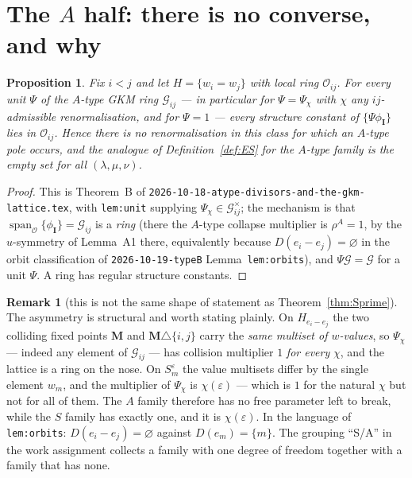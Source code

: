 \documentclass[11pt]{article}
\newtheorem{prop}[thm]{Proposition}
\theoremstyle{definition}
\newtheorem{rem}[thm]{Remark}
\newcommand{\bM}{\mathbf{M}}
\newcommand{\bI}{\mathbf{I}}
\begin{document}
\section{The $A$ half: there is no converse, and why}
\label{sec:Ahalf}

\begin{prop}\label{prop:A}
Fix $i<j$ and let $H=\{w_i=w_j\}$ with local ring $\mathcal{O}_{ij}$.  For
\emph{every} unit $\Psi$ of the $A$-type GKM ring $\mathcal{G}_{ij}$ --- in
particular for $\Psi=\Psi_\chi$ with $\chi$ any $ij$-admissible renormalisation,
and for $\Psi=1$ --- every structure constant of $\{\Psi\phi_{\bI}\}$ lies in
$\mathcal{O}_{ij}$.  Hence there is no renormalisation in this class for which an
$A$-type pole occurs, and the analogue of Definition~\ref{def:ES} for the
$A$-type family is the empty set for all $(\lambda,\mu,\nu)$.
\end{prop}

\begin{proof}
This is Theorem~B of
\texttt{2026-10-18-atype-divisors-and-the-gkm-lattice.tex}, with
\texttt{lem:unit} supplying $\Psi_\chi\in\mathcal{G}_{ij}^{\times}$; the mechanism
is that $\operatorname{span}_{\mathcal{O}}\{\phi_{\bI}\}=\mathcal{G}_{ij}$ is a
\emph{ring} (there the $A$-type collapse multiplier is $\rho^{A}=1$, by the
$u$-symmetry of Lemma~A1 there, equivalently because $D(e_i-e_j)=\varnothing$ in
the orbit classification of \texttt{2026-10-19-typeB} Lemma~\texttt{lem:orbits}),
and $\Psi\mathcal{G}=\mathcal{G}$ for a unit $\Psi$.  A ring has regular
structure constants.
\end{proof}

\begin{rem}[this is not the same shape of statement as Theorem~\ref{thm:Sprime}]
The asymmetry is structural and worth stating plainly.  On $H_{e_i-e_j}$ the two
colliding fixed points $\bM$ and $\bM\triangle\{i,j\}$ carry the \emph{same
multiset of $w$-values}, so $\Psi_\chi$ --- indeed any element of
$\mathcal{G}_{ij}$ --- has collision multiplier $1$ \emph{for every} $\chi$,
and the lattice is a ring on the nose.  On $S_m^{\varepsilon}$ the value
multisets differ by the single element $w_m$, and the multiplier of $\Psi_\chi$ is
$\chi(\varepsilon)$ --- which is $1$ for the natural $\chi$ but not for all of
them.  The $A$ family therefore has no free parameter left to break, while the
$S$ family has exactly one, and it is $\chi(\varepsilon)$.  In the language of
\texttt{lem:orbits}: $D(e_i-e_j)=\varnothing$ against $D(e_m)=\{m\}$.  The
grouping ``S/A'' in the work assignment collects a family with one degree of
freedom together with a family that has none.
\end{rem}
\end{document}
